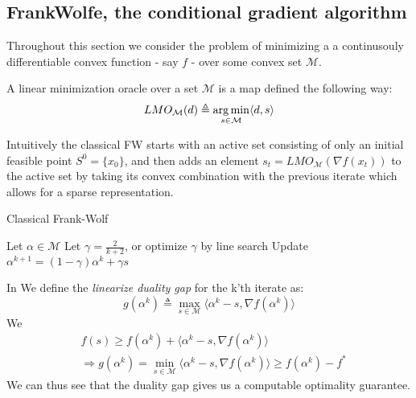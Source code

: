 \subsection{Frank\-Wolfe, the conditional gradient algorithm}
Throughout this section we consider the problem of minimizing a
a continusouly differentiable convex function - say $f$ - over some convex set
$\mathcal M$.
\begin{definition}
  A linear minimization oracle over a set $\mathcal M$ is a map defined the following way:
  \begin{equation}
    LMO_{\mathcal{M}}(d) \triangleq \operatorname*{\arg\min}_{s \in\mathcal{M}}\langle d, s \rangle
    \label{eq:lmo}
  \end{equation}
\end{definition}


Intuitively the classical FW starts with an active set consisting of only an initial feasible
point $S^{0}= \{x_{0}\}$, and then adds an element $s_{t}=
LMO_{\mathcal{M}}(\nabla f(x_{t}))$ to the active set by taking its
convex combination with the previous iterate which allows for a sparse
representation.
\begin{algorithm}
  \caption{Classical Frank-Wolf}
  \label{alg:fw}
\begin{algorithmic}
   \STATE Let $\alpha\in\mathcal{M}$
   \STATE Let $\gamma = \frac{2}{k+2}$, or optimize $\gamma$ by line search
   \STATE Update $\alpha^{k+1}= (1-\gamma)\alpha^{k}+ \gamma s$
   \ENDFOR
\end{algorithmic}
\end{algorithm}

In \citet{lacoste-julienBlockCoordinateFrankWolfeOptimization2013} 
We define the \emph{linearize duality gap} for the k'th iterate as:
\begin{equation}
  g(\alpha^{k}) \triangleq \max_{s\in\mathcal{M}}\langle \alpha^{k}-s, \nabla f(\alpha^{k})\rangle
  \label{eq:dualityGapDef}
\end{equation}
We
\begin{align}
    &f(s)\geq f(\alpha^{k})+ \langle \alpha^{k}-s, \nabla f(\alpha^{k})\rangle\\
    &\Longrightarrow g(\alpha^{k})=
      \min_{s\in\mathcal{M}}\langle \alpha^{k}-s, \nabla
      f(\alpha^{k})\rangle \geq f(\alpha^{k})- f^{*}
\end{align}
We can thus see that the duality gap gives us a computable optimality guarantee. \\

